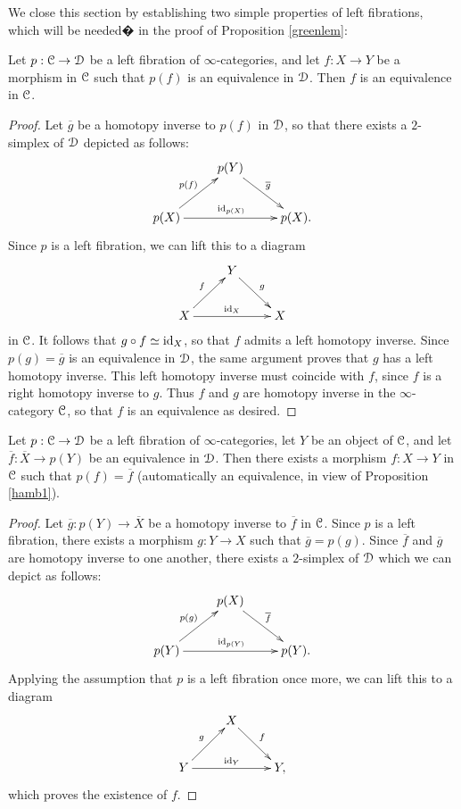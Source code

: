 We close this section by establishing two simple properties of left fibrations, which will be needed� in the proof of Proposition \ref{greenlem}:

\begin{proposition}\label{hamb1}
Let $p: \operatorname{\mathcal{C}} \rightarrow \operatorname{\mathcal{D}}$ be a left fibration of $\infty$-categories, and let
$f: X \rightarrow Y$ be a morphism in $\operatorname{\mathcal{C}}$ such that $p(f)$ is an equivalence in
$\operatorname{\mathcal{D}}$. Then $f$ is an equivalence in $\operatorname{\mathcal{C}}$.
\end{proposition}

\begin{proof}
Let $\overline{g}$ be a homotopy inverse to $p(f)$ in $\operatorname{\mathcal{D}}$, so that
there exists a $2$-simplex of $\operatorname{\mathcal{D}}$ depicted as follows:
$$ \xymatrix{ & p(Y) \ar[dr]^{\overline{g}} & \\
p(X) \ar[ur]^{p(f)} \ar[rr]^{\id_{p(X)}} & & p(X). }$$
Since $p$ is a left fibration, we can lift this to a diagram
$$ \xymatrix{ & Y \ar[dr]^{g} & \\
X \ar[ur]^{f} \ar[rr]^{\id_{X}} & & X }$$
in $\operatorname{\mathcal{C}}$. It follows that $g \circ f \simeq \operatorname{id}_{X}$, so that $f$ admits a left homotopy inverse.
Since $p(g) = \overline{g}$ is an equivalence in $\operatorname{\mathcal{D}}$, the same argument proves that
$g$ has a left homotopy inverse. This left homotopy inverse must coincide with $f$, since $f$ is a right homotopy inverse to $g$. Thus $f$ and $g$ are homotopy inverse in the $\infty$-category $\operatorname{\mathcal{C}}$, so that $f$ is an equivalence as desired.
\end{proof}

\begin{proposition}\label{hamb2}
Let $p: \operatorname{\mathcal{C}} \rightarrow \operatorname{\mathcal{D}}$ be a left fibration of $\infty$-categories, let
$Y$ be an object of $\operatorname{\mathcal{C}}$, and let
$\overline{f}: \overline{X} \rightarrow p(Y)$ be an equivalence in $\operatorname{\mathcal{D}}$. Then
there exists a morphism $f: X \rightarrow Y$ in $\operatorname{\mathcal{C}}$ such that $p(f) = \overline{f}$
(automatically an equivalence, in view of Proposition \ref{hamb1}). 
\end{proposition}

\begin{proof}
Let $\overline{g}: p(Y) \rightarrow \overline{X}$ be a homotopy inverse to $\overline{f}$
in $\operatorname{\mathcal{C}}$. Since $p$ is a left fibration, there exists a morphism
$g: Y \rightarrow X$ such that $\overline{g} = p(g)$. Since $\overline{f}$ and $\overline{g}$
are homotopy inverse to one another, there exists a $2$-simplex of $\operatorname{\mathcal{D}}$ which we can depict as follows:
$$ \xymatrix{ & p(X) \ar[dr]^{\overline{f}} & \\
p(Y) \ar[ur]^{ p(g) } \ar[rr]^{ \id_{p(Y)} } & & p(Y). }$$
Applying the assumption that $p$ is a left fibration once more, we can lift this to a diagram
$$ \xymatrix{ & X \ar[dr]^{f} & \\
Y \ar[ur]^{g} \ar[rr]^{\id_{Y}} & & Y, }$$
which proves the existence of $f$.
\end{proof}

